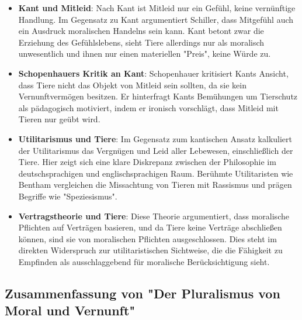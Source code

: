 \documentclass{article}
\begin{document}
\begin{itemize}
	\item \textbf{Kant und Mitleid}: Nach Kant ist Mitleid nur ein Gefühl, keine vernünftige Handlung. Im Gegensatz zu Kant argumentiert Schiller, dass Mitgefühl auch ein Ausdruck moralischen Handelns sein kann. Kant betont zwar die Erziehung des Gefühlslebens, sieht Tiere allerdings nur als moralisch unwesentlich und ihnen nur einen materiellen "Preis", keine Würde zu.

	\item \textbf{Schopenhauers Kritik an Kant}: Schopenhauer kritisiert Kants Ansicht, dass Tiere nicht das Objekt von Mitleid sein sollten, da sie kein Vernunftvermögen besitzen. Er hinterfragt Kants Bemühungen um Tierschutz als pädagogisch motiviert, indem er ironisch vorschlägt, dass Mitleid mit Tieren nur geübt wird.

	\item \textbf{Utilitarismus und Tiere}: Im Gegensatz zum kantischen Ansatz kalkuliert der Utilitarismus das Vergnügen und Leid aller Lebewesen, einschließlich der Tiere. Hier zeigt sich eine klare Diskrepanz zwischen der Philosophie im deutschsprachigen und englischsprachigen Raum. Berühmte Utilitaristen wie Bentham vergleichen die Missachtung von Tieren mit Rassismus und prägen Begriffe wie "Speziesismus".

	\item \textbf{Vertragstheorie und Tiere}: Diese Theorie argumentiert, dass moralische Pflichten auf Verträgen basieren, und da Tiere keine Verträge abschließen können, sind sie von moralischen Pflichten ausgeschlossen. Dies steht im direkten Widerspruch zur utilitaristischen Sichtweise, die die Fähigkeit zu Empfinden als ausschlaggebend für moralische Berücksichtigung sieht.
\end{itemize}

\subsection{Zusammenfassung von "Der Pluralismus von Moral und Vernunft"}
\end{document}
